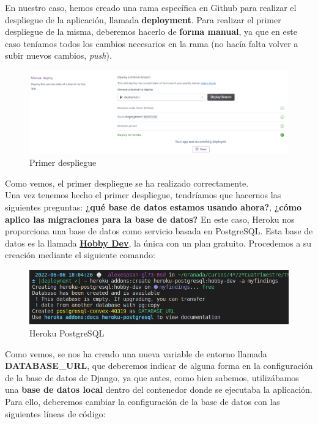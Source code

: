 En nuestro caso, hemos creado una rama específica en Github para realizar el despliegue de
la aplicación, llamada \textbf{deployment}. Para realizar el primer despliegue de la misma,
deberemos hacerlo de \textbf{forma manual}, ya que en este caso teníamos todos los cambios
necesarios en la rama (no hacía falta volver a subir nuevos cambios, \textit{push}).\\

    \begin{figure}[H]
        \centering
        \includegraphics[scale=0.30]{imagenes/first-deploy.png}
        \caption{Primer despliegue}
        \label{fig:first-deploy}
    \end{figure}

Como vemos, el primer despliegue se ha realizado correctamente.\\


Una vez tenemos hecho el primer despliegue, tendríamos que hacernos las siguientes
preguntas: \textbf{¿qué base de datos estamos usando ahora?}, \textbf{¿cómo aplico las
migraciones para la base de datos?} En este caso, Heroku nos proporciona una base de
datos como servicio basada en PostgreSQL. Esta base de datos es la llamada
\href{https://elements.heroku.com/addons/heroku-postgresql}{\textbf{Hobby Dev}}, la única
con un plan gratuito. Procedemos a su creación mediante el siguiente comando:

    \begin{figure}[H]
        \centering
        \includegraphics[scale=0.50]{imagenes/heroku-postgresql.png}
        \caption{Heroku PostgreSQL}
        \label{fig:heroku-postgresql}
    \end{figure}

Como vemos, se nos ha creado una nueva variable de entorno llamada \textbf{DATABASE\_URL},
que deberemos indicar de alguna forma en la configuración de la base de datos de Django,
ya que antes, como bien sabemos, utilizábamos una \textbf{base de datos local} dentro del
contenedor donde se ejecutaba la aplicación. Para ello, deberemos cambiar la configuración
de la base de datos con las siguientes líneas de código:


